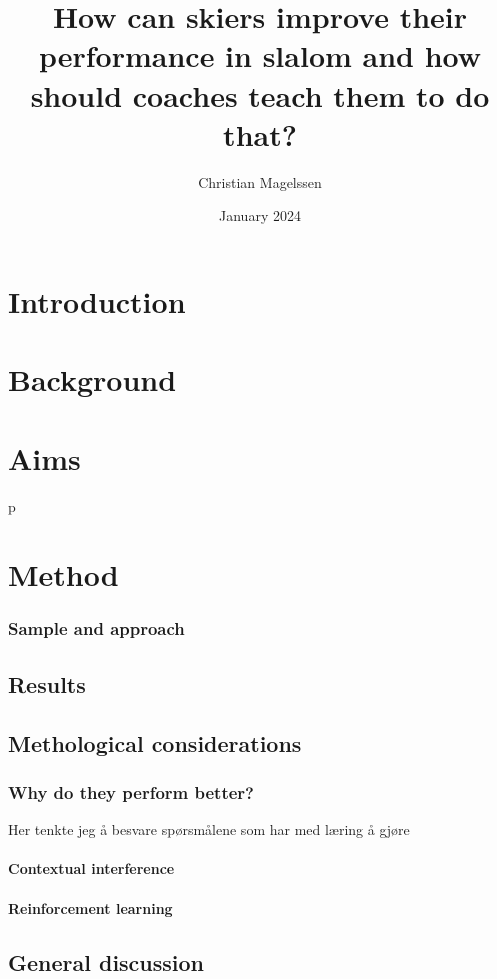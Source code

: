 \documentclass{report}
\title{How can skiers improve their performance in slalom and how should coaches teach them to do that? }
\author{Christian Magelssen}
\date{January 2024}
\begin{document}
\maketitle

\listoffigures

\chapter{Introduction}


\chapter{Background}


\chapter{Aims}



p
\chapter{Method}



\subsection{Sample and approach}


\section{Results}


\section{Methological considerations}

\subsection{Why do they perform better?}
Her tenkte jeg å besvare spørsmålene som har med læring å gjøre

\subsubsection{Contextual interference}

\subsubsection{Reinforcement learning}







\section{General discussion}




\printbibliography
\end{document}
